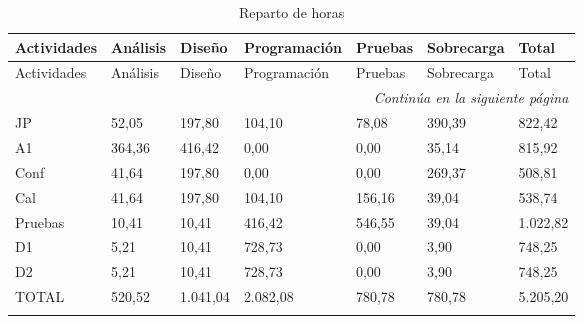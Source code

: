 \documentclass[10pt,a4paper,oldfontcommands]{plantillaDPDS}
\begin{document}
\begin{center}
\begin{longtable}{|l|l|l|l|l|l|l|}

Actividades & Análisis	&	Diseño	&	Programación	&	Pruebas	&	Sobrecarga	&	Total \\
\hline
\endfirsthead
Actividades & Análisis	&	Diseño	&	Programación	&	Pruebas	&	Sobrecarga	&	Total \\
\hline
\endhead

\hline \multicolumn{7}{r}{\textit{Continúa en la siguiente página}} \\
\endfoot
\hline
\endlastfoot

JP	&	52,05	&	197,80	&	104,10	&	78,08	&	390,39	&	822,42	\\
A1	&	364,36	&	416,42	&	0,00	&	0,00	&	35,14	&	815,92	\\
Conf	&	41,64	&	197,80	&	0,00	&	0,00	&	269,37	&	508,81	\\
Cal	&	41,64	&	197,80	&	104,10	&	156,16	&	39,04	&	538,74	\\
Pruebas	&	10,41	&	10,41	&	416,42	&	546,55	&	39,04	&	1.022,82	\\
D1	&	5,21	&	10,41	&	728,73	&	0,00	&	3,90	&	748,25	\\
D2	&	5,21	&	10,41	&	728,73	&	0,00	&	3,90	&	748,25	\\	\hline \hline
TOTAL	&	520,52	&	1.041,04	&	2.082,08	&	780,78	&	780,78	&	5.205,20	\\	\hline

\caption{Reparto de horas}\\
\end{longtable}
\end{center}
\end{document}
